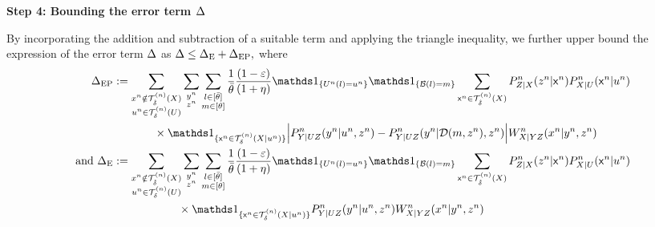 \noindent \textbf{Step 4: Bounding the error term ${\Delta}$}

\noindent By incorporating the addition and subtraction of a suitable term and applying the triangle inequality, we further upper bound the expression of the error term ${\Delta}$ as ${\Delta} \leq {\Delta}_{\text{E}} + {\Delta}_{\text{EP}},$ where
\begin{align*}
     \epe &\deq \sum_{\substack{\xn \notin \Tx \\ \un \in \Tu }} \sum_{\substack{\yn \\ \zn}} \sum_{\substack{ l \in [\btheta]\\m\in [\theta] }} 
    \frac{1}{\btheta} \frac{(1-\varepsilon)}{(1+\eta)} 
    \I_{\set{\Un(l) = \un}} \I_{\set{\calB(l) = m}} 
    \sum_{\sfxn \in \Tx}P_{Z|X}^n(\zn|\sfxn) P_{X|U}^n(\sfxn|\un)\\
    & \hspace{0.5in}  \times  \I_{\set{\sfxn \in \Txcond}} \Big| P^n_{Y|UZ}(\yn|\un,\zn) - P^n_{Y|UZ}(\yn|\calD(m,\zn),\zn)\Big| W^n_{X|YZ}(\xn|\yn,\zn)\\
    \eqand \ee &\deq\sum_{\substack{\xn \notin \Tx \\ \un \in \Tu }} \sum_{\substack{\yn \\ \zn}} \sum_{\substack{ l \in [\btheta]\\m\in [\theta] }} 
    \frac{1}{\btheta} \frac{(1-\varepsilon)}{(1+\eta)} 
    \I_{\set{\Un(l) = \un}} \I_{\set{\calB(l) = m}} 
    \sum_{\sfxn \in \Tx}P_{Z|X}^n(\zn|\sfxn) P_{X|U}^n(\sfxn|\un) \\
    & \hspace{0.8in}  \times  \I_{\set{\sfxn \in \Txcond}} P^n_{Y|UZ}(\yn|\un,\zn)W^n_{X|YZ}(\xn|\yn,\zn)
\end{align*}

